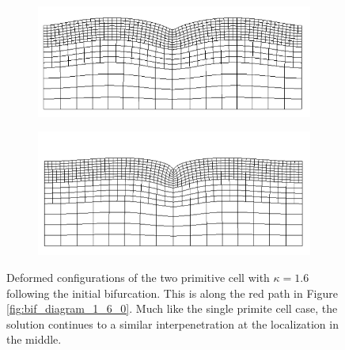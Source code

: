 \documentclass[11pt]{report}
\begin{document}
\begin{figure}[!htb]
	\begin{subfigure}[b]{0.5\textwidth}
		\includegraphics[width=\textwidth]{mesh/mesh_1_6_2_low}
	\end{subfigure}
    \begin{subfigure}[b]{0.5\textwidth}
		\includegraphics[width=\textwidth]{mesh/mesh_1_6_2_high}
	\end{subfigure}
	\captionsetup{format=hang}
	\caption{Deformed configurations of the two primitive cell with $\kappa = 1.6$ following the initial bifurcation. This is along the red path in Figure \ref{fig:bif_diagram_1_6_0}. Much like the single primite cell case, the solution continues to a similar interpenetration at the localization in the middle.}
    \label{fig:mesh_1_6_2}
\end{figure}
\end{document}
